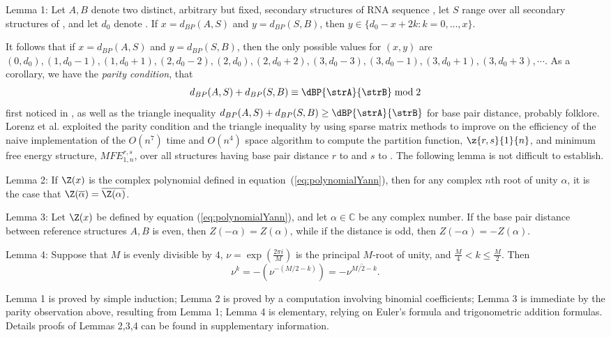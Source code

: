 \noindent
{\sc Lemma 1:} Let $A,B$ denote two distinct, arbitrary but fixed,
 secondary structures of RNA sequence \seq, let $S$ range over
all secondary structures of \seq, and let $d_0$ denote \dBP{\strA}{\strB}.
If $x=d_{BP}(A,S)$ and $y=d_{BP}(S,B)$, then
$y \in \{ d_0-x+2k: k=0,\ldots,x\}$.
\medskip

\noindent
It follows that if $x=d_{BP}(A,S)$ and $y=d_{BP}(S,B)$,
then the only possible values for
$(x,y)$ are $(0,d_0), (1,d_0-1), (1,d_0+1),
(2,d_0-2), (2,d_0), (2, d_0+2),
(3,d_0-3), (3,d_0-1), (3, d_0+1), (3,d_0+3), \cdots$.
As a corollary, we have the {\em parity condition}, that
\begin{eqnarray}
\label{eq:parity}
d_{BP}(A,S)+d_{BP}(S,B) \equiv \dBP{\strA}{\strB} \bmod 2
\end{eqnarray}
first noticed in \citep{hofacker:RNAbor2D}, as well as
the triangle inequality
$d_{BP}(A,S)+d_{BP}(S,B) \geq \dBP{\strA}{\strB}$
for base pair distance, probably folklore.
Lorenz et al. \citep{hofacker:RNAbor2D} exploited the parity condition
and the triangle inequality by using sparse matrix methods to improve on
the efficiency of the naive  implementation of the
$O(n^7)$ time and $O(n^4)$ space algorithm to compute
the partition function, $\z{r,s}{1}{n}$,
and minimum free energy structure, $MFE^{r,s}_{1,n}$, over all
structures having base pair distance $r$ to \strA and $s$ to \strB.
The following lemma is not difficult to establish.
\medskip

\noindent
{\sc Lemma 2:} If $\Z(x)$ is the complex polynomial defined in
equation~(\ref{eq:polynomialYann}), then for any complex $n$th root of
unity $\alpha$, it is the case that $\Z(\overline{\alpha}) =
\overline{\Z(\alpha)}$.
\medskip

\noindent
{\sc Lemma 3:}
Let $\Z(x)$ be defined by equation (\ref{eq:polynomialYann}), and
let $\alpha \in \mathbb{C}$ be any complex number.
If the base pair distance between reference
structures $A,B$ is even, then $Z(-\alpha)=Z(\alpha)$, while if
the distance is odd, then $Z(-\alpha)=-Z(\alpha)$.
\medskip

\noindent
{\sc Lemma 4:} Suppose that $M$ is evenly divisible by $4$,
$\nu = \exp(\frac{2 \pi i}{M})$ is the principal $M$-root of unity, and
$\frac{M}{4} < k \leq \frac{M}{2}$. Then
\[
\nu^k = -(\nu^{-(M/2-k)}) = - \overline{\nu^{M/2-k}}.
\]
\medskip

Lemma 1 is proved by simple induction; Lemma 2
is proved by a computation involving binomial coefficients;
Lemma 3 is immediate
by the parity observation above, resulting from Lemma 1;
Lemma 4 is elementary, relying on Euler's
formula and trigonometric addition formulas. Details proofs of
Lemmas 2,3,4 can be found in supplementary information.

